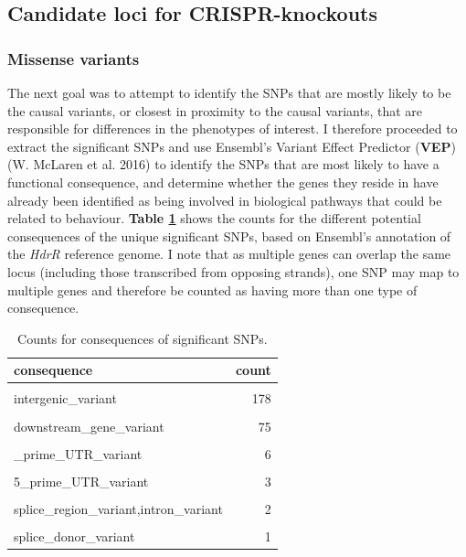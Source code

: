 \documentclass[
]{book}
\begin{document}
\hypertarget{candidate-loci-for-crispr-knockouts}{%
\subsection{Candidate loci for CRISPR-knockouts}\label{candidate-loci-for-crispr-knockouts}}

\hypertarget{missense-variants}{%
\subsubsection{Missense variants}\label{missense-variants}}

The next goal was to attempt to identify the SNPs that are mostly likely to be the causal variants, or closest in proximity to the causal variants, that are responsible for differences in the phenotypes of interest. I therefore proceeded to extract the significant SNPs and use Ensembl's Variant Effect Predictor (\textbf{VEP}) (W. McLaren et al. 2016) to identify the SNPs that are most likely to have a functional consequence, and determine whether the genes they reside in have already been identified as being involved in biological pathways that could be related to behaviour. \textbf{Table \ref{tab:F2-sig-snps-consq-counts}} shows the counts for the different potential consequences of the unique significant SNPs, based on Ensembl's annotation of the \emph{HdrR} reference genome. I note that as multiple genes can overlap the same locus (including those transcribed from opposing strands), one SNP may map to multiple genes and therefore be counted as having more than one type of consequence.

\begin{table}

\caption{\label{tab:F2-sig-snps-consq-counts}Counts for consequences of significant SNPs.}
\centering
\begin{tabular}[t]{lr}
\toprule
consequence & count\\
\midrule
\cellcolor{gray!6}{intron\_variant} & \cellcolor{gray!6}{349}\\
intergenic\_variant & 178\\
\cellcolor{gray!6}{upstream\_gene\_variant} & \cellcolor{gray!6}{92}\\
downstream\_gene\_variant & 75\\
\cellcolor{gray!6}{synonymous\_variant} & \cellcolor{gray!6}{9}\\
\addlinespace
3\_prime\_UTR\_variant & 6\\
\cellcolor{gray!6}{missense\_variant} & \cellcolor{gray!6}{6}\\
5\_prime\_UTR\_variant & 3\\
\cellcolor{gray!6}{splice\_acceptor\_variant} & \cellcolor{gray!6}{2}\\
splice\_region\_variant,intron\_variant & 2\\
\addlinespace
\cellcolor{gray!6}{splice\_region\_variant,synonymous\_variant} & \cellcolor{gray!6}{2}\\
splice\_donor\_variant & 1\\
\bottomrule
\end{tabular}
\end{table}
\end{document}
